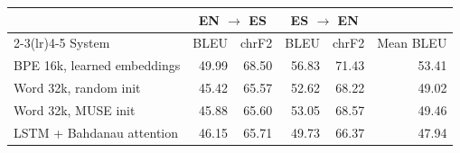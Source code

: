 \begin{tabular}{lrrrrr}
\toprule
& \multicolumn{2}{c}{EN $\rightarrow$ ES} & \multicolumn{2}{c}{ES $\rightarrow$ EN} & \\
\cmidrule(lr){2-3}\cmidrule(lr){4-5}
System & BLEU & chrF2 & BLEU & chrF2 & Mean BLEU \\
\midrule
BPE 16k, learned embeddings & 49.99 & 68.50 & 56.83 & 71.43 & 53.41 \\
Word 32k, random init & 45.42 & 65.57 & 52.62 & 68.22 & 49.02 \\
Word 32k, MUSE init & 45.88 & 65.60 & 53.05 & 68.57 & 49.46 \\
LSTM + Bahdanau attention & 46.15 & 65.71 & 49.73 & 66.37 & 47.94 \\
\bottomrule
\end{tabular}
